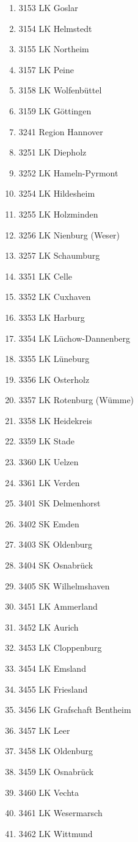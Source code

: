 \begin{enumerate}[itemsep=-6mm]
\item 3153 LK Goslar
\item 3154 LK Helmstedt
\item 3155 LK Northeim
\item 3157 LK Peine
\item 3158 LK Wolfenbüttel
\item 3159 LK Göttingen
\item 3241 Region Hannover
\item 3251 LK Diepholz
\item 3252 LK Hameln-Pyrmont
\item 3254 LK Hildesheim
\item 3255 LK Holzminden
\item 3256 LK Nienburg (Weser)
\item 3257 LK Schaumburg
\item 3351 LK Celle
\item 3352 LK Cuxhaven
\item 3353 LK Harburg
\item 3354 LK Lüchow-Dannenberg
\item 3355 LK Lüneburg
\item 3356 LK Osterholz
\item 3357 LK Rotenburg (Wümme)
\item 3358 LK Heidekreis
\item 3359 LK Stade
\item 3360 LK Uelzen
\item 3361 LK Verden
\item 3401 SK Delmenhorst
\item 3402 SK Emden
\item 3403 SK Oldenburg
\item 3404 SK Osnabrück
\item 3405 SK Wilhelmshaven
\item 3451 LK Ammerland
\item 3452 LK Aurich
\item 3453 LK Cloppenburg
\item 3454 LK Emsland
\item 3455 LK Friesland
\item 3456 LK Grafschaft Bentheim
\item 3457 LK Leer
\item 3458 LK Oldenburg
\item 3459 LK Osnabrück
\item 3460 LK Vechta
\item 3461 LK Wesermarsch
\item 3462 LK Wittmund

\end{enumerate}
